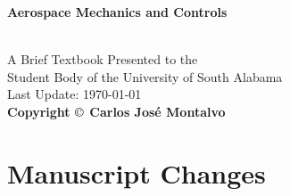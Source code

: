 \documentclass{article}
\begin{document}
\begin{center}
\begin{LARGE}{\bf Aerospace Mechanics and Controls}\end{LARGE}\\
\large
\vspace{22 mm}
   A Brief Textbook Presented to the \\ 
   Student Body of the University of South Alabama \\
\vspace{22 mm}
\vspace{22 mm}
\vspace{22 mm}
Last Update: \today\\
{\bf Copyright $\copyright$ Carlos Jos\'{e} Montalvo}
\end{center}

\linespread{1}

\newpage


\section*{Manuscript Changes}
\end{document}
